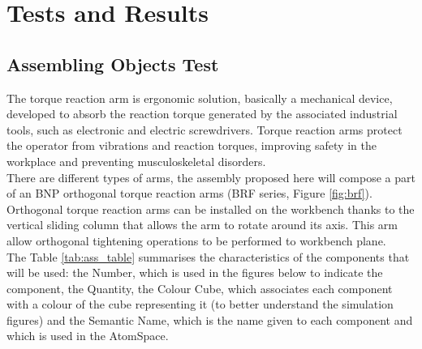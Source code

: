 
\chapter{Tests and Results} \label{cha:test}

\section{Assembling Objects Test}\label{sec:ass_objs_test}

The torque reaction arm is ergonomic solution, basically a mechanical device, developed to absorb the reaction torque generated by the associated industrial tools, such as electronic and electric screwdrivers.
Torque reaction arms protect the operator from vibrations and reaction torques, improving safety in the workplace and preventing musculoskeletal disorders. \\
There are different types of arms, the assembly proposed here will compose a part of an BNP orthogonal torque reaction arms (BRF series, Figure \ref{fig:brf}). \\
Orthogonal torque reaction arms can be installed on the workbench thanks to the vertical sliding column that allows the arm to rotate around its axis. 
This arm allow orthogonal tightening operations to be performed to workbench plane. \\

The Table \ref{tab:ass_table} summarises the characteristics of the components that will be used: the Number, which is used in the figures below to indicate the component, the Quantity, the Colour Cube, which associates each component with a colour of the cube representing it (to better understand the simulation figures) and the Semantic Name, which is the name given to each component and which is used in the AtomSpace.

